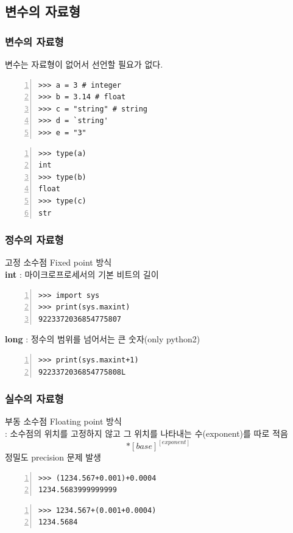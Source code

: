 \documentclass[10pt]{beamer}
\begin{document}
\subsection{변수의 자료형}
\begin{frame}[fragile]
\frametitle{변수의 자료형}
변수는 자료형이 없어서 선언할 필요가 없다.
\begin{Verbatim}[numbers=left,commandchars=\\\{\}]
>>> a = 3 # integer
>>> b = 3.14 # float
>>> c = "string" # string
>>> d = `string'
>>> e = "3"
\end{Verbatim}
\vspace{5mm}
\begin{Verbatim}[numbers=left,commandchars=\\\{\}]
>>> type(a)
int
>>> type(b)
float
>>> type(c)
str
\end{Verbatim}
\end{frame}

\begin{frame}[fragile]
\frametitle{정수의 자료형}
고정 소수점 Fixed point 방식\\
\vspace{10mm}
\textbf{int} : 마이크로프로세서의 기본 비트의 길이
\begin{Verbatim}[numbers=left,commandchars=\\\{\}]
>>> import sys
>>> print(sys.maxint)
9223372036854775807
\end{Verbatim}
\vspace{10mm}
\textbf{long} : 정수의 범위를 넘어서는 큰 숫자(only python2)
\begin{Verbatim}[numbers=left,commandchars=\\\{\}]
>>> print(sys.maxint+1)
9223372036854775808L
\end{Verbatim}
\end{frame}

\begin{frame}[fragile]
\frametitle{실수의 자료형}
부동 소수점 Floating point 방식\\
\small{: 소수점의 위치를 고정하지 않고 그 위치를 나타내는 수(exponent)를 따로 적음}\\
\begin{equation*}
[mantissa]*[base]^{[exponent]}
\end{equation*}
\vspace{10mm}
정밀도 precision 문제 발생
\begin{Verbatim}[numbers=left,commandchars=\\\{\}]
>>> (1234.567+0.001)+0.0004
1234.5683999999999
\end{Verbatim}
\vspace{5mm}
\begin{Verbatim}[numbers=left,commandchars=\\\{\}]
>>> 1234.567+(0.001+0.0004)
1234.5684
\end{Verbatim}
\end{frame}
\end{document}
